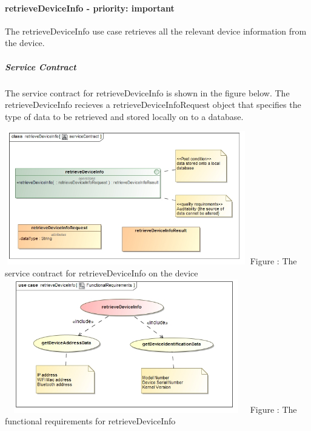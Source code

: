 \documentclass[hidelinks, 12pt, oneside]{article}
\begin{document}
	\paragraph{retrieveDeviceInfo - priority: important}
		The retrieveDeviceInfo use case retrieves all the relevant device information from the device.\newline
		
		\subparagraph{Service Contract}
		The service contract for retrieveDeviceInfo is shown in the figure below. The retrieveDeviceInfo 			recieves a retrieveDeviceInfoRequest object that specifies the type of data to be retrieved and 			stored locally on to a database.
		
		\includegraphics[width=400px,height=220px]{img/serviceContractRetrieveDeviceInfo.jpg}
		Figure : The service contract for retrieveDeviceInfo on the device
		\newline
		\includegraphics[width=400px,height=220px]{img/functionalRequirementsRetrieveDeviceInfo.jpg}
		Figure : The functional requirements for retrieveDeviceInfo
		\newline
		
\end{document}
